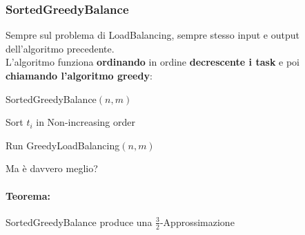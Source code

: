 \subsubsection{SortedGreedyBalance}
Sempre sul problema di LoadBalancing, sempre stesso input e output dell'algoritmo precedente.\\

L'algoritmo funziona \textbf{ordinando} in ordine \textbf{decrescente i task} e poi \textbf{chiamando l'algoritmo greedy}:

\begin{algorithm}
	\caption{SortedGreedyBalance$(n, m)$}
	\begin{algorithmic}
		\STATE Sort $t_i$ in Non-increasing order
		\item Run GreedyLoadBalancing$(n,m)$
	\end{algorithmic}
\end{algorithm}

Ma è davvero meglio? \\

\paragraph{Teorema:} SortedGreedyBalance produce una $\frac{3}{2}$-Approssimazione

